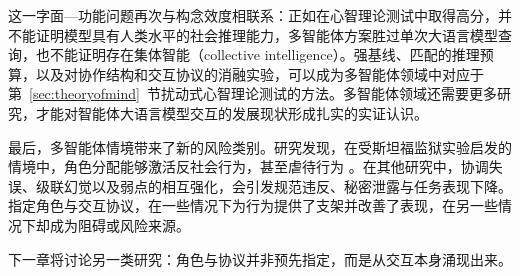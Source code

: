 这一字面—功能问题再次与构念效度相联系：正如在心智理论测试中取得高分，并不能证明模型具有人类水平的社会推理能力，多智能体方案胜过单次大语言模型查询，也不能证明存在集体智能（collective intelligence）。强基线、匹配的推理预算，以及对协作结构和交互协议的消融实验，可以成为多智能体领域中对应于第~\ref{sec:theoryofmind}~节扰动式心智理论测试的方法。多智能体领域还需要更多研究，才能对智能体大语言模型交互的发展现状形成扎实的实证认识。

最后，多智能体情境带来了新的风险类别。研究发现，在受斯坦福监狱实验启发的情境中，角色分配能够激活反社会行为，甚至虐待行为 \citep{campedelli2024want}。在其他研究中，协调失误、级联幻觉以及弱点的相互强化，会引发规范违反、秘密泄露与任务表现下降。指定角色与交互协议，在一些情况下为行为提供了支架并改善了表现，在另一些情况下却成为阻碍或风险来源。

下一章将讨论另一类研究：角色与协议并非预先指定，而是从交互本身涌现出来。




